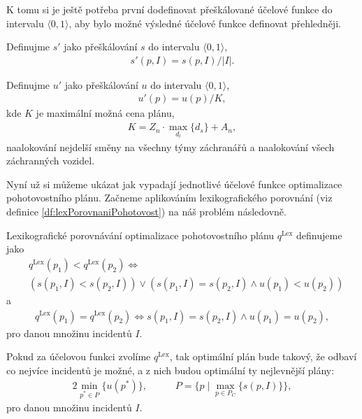 K tomu si je ještě potřeba první dodefinovat přeškálované účelové funkce do intervalu $\langle 0, 1 \rangle$, aby
bylo možné výsledné účelové funkce definovat přehledněji.
\begin{definice} \label{df:simulaceSkal}
  Definujme $s'$ jako přeškálování $s$ do intervalu $\langle 0, 1 \rangle$,
  \begin{align*}
    s'(p, I) = s(p, I) / |I|.
  \end{align*}
\end{definice}
\begin{definice} \label{df:cenaPlanuSkal}
  Definujme $u'$ jako přeškálování $u$ do intervalu $\langle 0, 1 \rangle$,
  \begin{align*}
    u'(p) = u(p) / K,
  \end{align*}
  kde $K$ je maximální možná cena plánu,
  \begin{align*}
    K = Z_n \cdot \max_{d_l} \{ d_s \} + A_n,
  \end{align*}
  naalokování nejdelší směny na všechny týmy záchranářů a naalokování všech záchranných vozidel.
\end{definice}

Nyní už si můžeme ukázat jak vypadají jednotlivé účelové funkce optimalizace pohotovostního plánu.
Začneme aplikováním lexikografického porovnání (viz definice \ref{df:lexPorovnaniPohotovost}) na náš problém následovně.
\begin{definice}\label{df:lexPorovnaniPohotovost}
  Lexikografické porovnávání optimalizace pohotovostního plánu $q^{\text{Lex}}$ definujeme jako
  \begin{align*}
    & q^{\text{Lex}}(p_1) < q^{\text{Lex}}(p_2)\Leftrightarrow\\
    & ( s(p_1, I) < s(p_2, I)) \lor (s(p_1, I) = s(p_2, I) \land u(p_1) < u(p_2))
  \end{align*}
  a 
  \begin{align*}
    q^{\text{Lex}}(p_1) = q^{\text{Lex}}(p_2) \Leftrightarrow s(p_1, I) = s(p_2, I) \land u(p_1) = u(p_2),
  \end{align*}
  pro danou množinu incidentů $I$.
\end{definice}

Pokud za účelovou funkci zvolíme $q^{\text{Lex}}$, tak optimální plán bude takový, že odbaví co nejvíce incidentů je možné, a z nich budou optimální ty nejlevnější plány:
\begin{alignat*}{2}
  \min_{p^* \in P} \{ u(p^*) \}, && \hspace{15pt} P = \{ p \mid \max_{p \in P_C} \{ s(p, I) \} \},
\end{alignat*}
pro danou množinu incidentů $I$.

